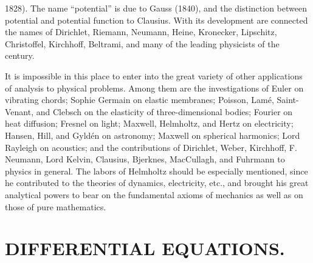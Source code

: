 \documentclass[oneside]{book}
\begin{document}
{1828). The name ``potential'' is due to Gauss (1840), and the
distinction between potential and potential function to
Clausius. With its development are connected the names of Dirichlet,
Riemann, Neumann, Heine, Kronecker, Lipschitz, Christoffel,
Kirchhoff, Beltrami, and many of the leading physicists of the
century.

It is impossible in this place to enter into the great variety of
other applications of analysis to physical problems. Among them are
the investigations of Euler on vibrating chords; Sophie Germain on
elastic membranes; Poisson, Lam\'e, Saint-Venant, and Clebsch on
the elasticity of three-dimensional bodies; Fourier on heat
diffusion; Fresnel on light; Maxwell, Helmholtz, and Hertz on
electricity; Hansen, Hill, and Gyld\'en on astronomy; Maxwell on
spherical harmonics; Lord Rayleigh on acoustics; and the
contributions of Dirichlet, Weber, Kirchhoff, F. Neumann, Lord
Kelvin, Clausius, Bjerknes, MacCullagh, and Fuhrmann to physics in
general. The labors of Helmholtz should be especially mentioned,
since he contributed to the theories of dynamics, electricity, etc.,
and brought his great analytical powers to bear on the fundamental
axioms of mechanics as well as on those of pure mathematics.

\chapter{DIFFERENTIAL EQUATIONS.}

}
\end{document}
